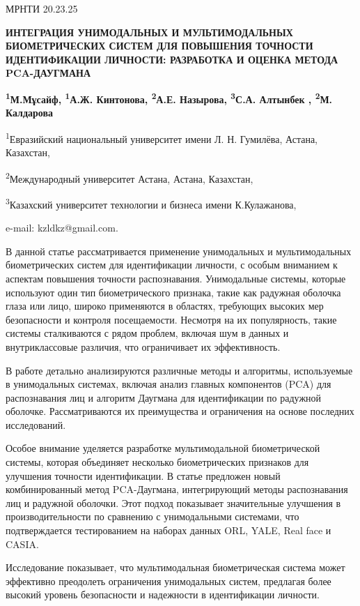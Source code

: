 МРНТИ 20.23.25

{\bfseries ИНТЕГРАЦИЯ УНИМОДАЛЬНЫХ И МУЛЬТИМОДАЛЬНЫХ БИОМЕТРИЧЕСКИХ СИСТЕМ
ДЛЯ ПОВЫШЕНИЯ ТОЧНОСТИ ИДЕНТИФИКАЦИИ ЛИЧНОСТИ: РАЗРАБОТКА И ОЦЕНКА
МЕТОДА PCA-ДАУГМАНА}

{\bfseries \textsuperscript{1}М.Мұсайф, \textsuperscript{1}А.Ж. Кинтонова,
\textsuperscript{2}А.Е. Назырова, \textsuperscript{3}С.А. Алтынбек ,
\textsuperscript{2}М. Калдарова}

\textsuperscript{1}Евразийский национальный университет имени Л. Н.
Гумилёва, Астана, Казахстан,

\textsuperscript{2}Международный университет Астана, Астана, Казахстан,

\textsuperscript{3}Казахский университет технологии и бизнеса имени
К.Кулажанова,

e-mail: kzldkz@gmail.com.

В данной статье рассматривается применение унимодальных и
мультимодальных биометрических систем для идентификации личности, с
особым вниманием к аспектам повышения точности распознавания.
Унимодальные системы, которые используют один тип биометрического
признака, такие как радужная оболочка глаза или лицо, широко применяются
в областях, требующих высоких мер безопасности и контроля посещаемости.
Несмотря на их популярность, такие системы сталкиваются с рядом проблем,
включая шум в данных и внутриклассовые различия, что ограничивает их
эффективность.

В работе детально анализируются различные методы и алгоритмы,
используемые в унимодальных системах, включая анализ главных компонентов
(PCA) для распознавания лиц и алгоритм Даугмана для идентификации по
радужной оболочке. Рассматриваются их преимущества и ограничения на
основе последних исследований.

Особое внимание уделяется разработке мультимодальной биометрической
системы, которая объединяет несколько биометрических признаков для
улучшения точности идентификации. В статье предложен новый
комбинированный метод PCA-Даугмана, интегрирующий методы распознавания
лиц и радужной оболочки. Этот подход показывает значительные улучшения в
производительности по сравнению с унимодальными системами, что
подтверждается тестированием на наборах данных ORL, YALE, Real face и
CASIA.

Исследование показывает, что мультимодальная биометрическая система
может эффективно преодолеть ограничения унимодальных систем, предлагая
более высокий уровень безопасности и надежности в идентификации
личности.

